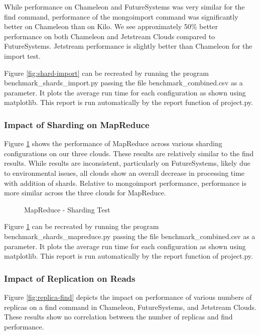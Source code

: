\documentclass[9pt,twocolumn,twoside]{../../styles/osajnl}
\begin{document}
While performance on Chameleon and FutureSystems was very similar for
the find command, performance of the mongoimport command was
significantly better on Chameleon than on Kilo. We see approximately
50\% better performance on both Chameleon and Jetstream Clouds
compared to FutureSystems. Jetstream performance is slightly better
than Chameleon for the import test.

Figure \ref{fig:shard-import} can be recreated by running the program
benchmark\_shards\_import.py passing the file benchmark\_combined.csv
as a parameter. It plots the average run time for each configuration
as shown using matplotlib. This report is run automatically by the
report function of project.py.

\subsubsection{Impact of Sharding on MapReduce}



Figure \ref{fig:shard-mapreduce} shows the performance of MapReduce
across various sharding configurations on our three clouds. These
results are relatively similar to the find results. While results are
inconsistent, particularly on FutureSystems, likely due to
environmental issues, all clouds show an overall decrease in
processing time with addition of shards. Relative to mongoimport
performance, performance is more similar across the three clouds for
MapReduce.

\begin{figure}[htbp]
\centering
{}
\caption{MapReduce - Sharding Test}
\label{fig:shard-mapreduce}
\end{figure}


Figure \ref{fig:shard-mapreduce} can be recreated by running the
program benchmark\_shards\_mapreduce.py passing the file
benchmark\_combined.csv as a parameter. It plots the average run time
for each configuration as shown using matplotlib. This report is run
automatically by the report function of project.py.

\subsubsection{Impact of Replication on Reads}



Figure \ref{fig:replica-find} depicts the impact on performance of
various numbers of replicas on a find command in Chameleon,
FutureSystems, and Jetstream Clouds. These results show no correlation
between the number of replicas and find performance.
\end{document}
